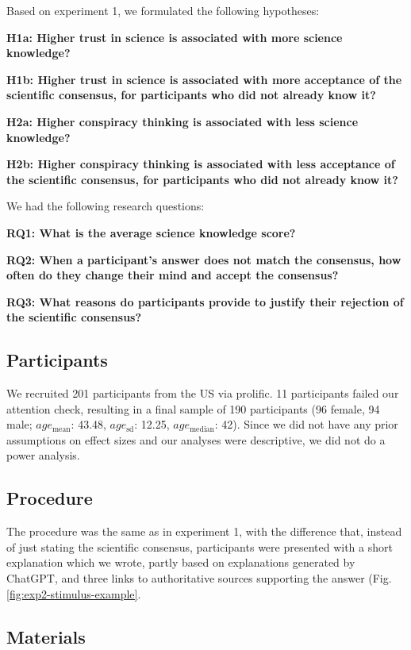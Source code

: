 \documentclass[
  doc,floatsintext]{apa6}
\begin{document}
Based on experiment 1, we formulated the following hypotheses:

\textbf{H1a: Higher trust in science is associated with more science knowledge?}

\textbf{H1b: Higher trust in science is associated with more acceptance of the scientific consensus, for participants who did not already know it?}

\textbf{H2a: Higher conspiracy thinking is associated with less science knowledge?}

\textbf{H2b: Higher conspiracy thinking is associated with less acceptance of the scientific consensus, for participants who did not already know it?}

We had the following research questions:

\textbf{RQ1: What is the average science knowledge score?}

\textbf{RQ2: When a participant's answer does not match the consensus, how often do they change their mind and accept the consensus?}

\textbf{RQ3: What reasons do participants provide to justify their rejection of the scientific consensus?}

\subsection{Participants}\label{participants-2}

We recruited 201 participants from the US via prolific. 11 participants failed our attention check, resulting in a final sample of 190 participants (96 female, 94 male; \(age_\text{mean}\): 43.48, \(age_\text{sd}\): 12.25, \(age_\text{median}\): 42). Since we did not have any prior assumptions on effect sizes and our analyses were descriptive, we did not do a power analysis.

\subsection{Procedure}\label{procedure-1}

The procedure was the same as in experiment 1, with the difference that, instead of just stating the scientific consensus, participants were presented with a short explanation which we wrote, partly based on explanations generated by ChatGPT, and three links to authoritative sources supporting the answer (Fig. \ref{fig:exp2-stimulus-example}.

\subsection{Materials}\label{materials-3}
\end{document}
